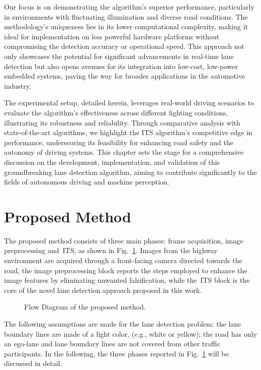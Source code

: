 Our focus is on demonstrating the algorithm's superior performance, particularly in environments with fluctuating illumination and diverse road conditions. The methodology's uniqueness lies in its lower computational complexity, making it ideal for implementation on less powerful hardware platforms without compromising the detection accuracy or operational speed. This approach not only showcases the potential for significant advancements in real-time lane detection but also opens avenues for its integration into low-cost, low-power embedded systems, paving the way for broader applications in the automotive industry.

The experimental setup, detailed herein, leverages real-world driving scenarios to evaluate the algorithm's effectiveness across different lighting conditions, illustrating its robustness and reliability. Through comparative analysis with state-of-the-art algorithms, we highlight the ITS algorithm's competitive edge in performance, underscoring its feasibility for enhancing road safety and the autonomy of driving systems. This chapter sets the stage for a comprehensive discussion on the development, implementation, and validation of this groundbreaking lane detection algorithm, aiming to contribute significantly to the fields of autonomous driving and machine perception.

\newpage

\section{Proposed Method}
\label{sec:proposed_algorithm}
The proposed method consists of three main phases: frame acquisition, image preprocessing and~\gls{ITS}, as shown in Fig.~\ref{fig:Scheme}.
\noindent Images from the highway environment are acquired through a front-facing camera directed towards the road, the image preprocessing block reports the steps employed to enhance the image features by eliminating unwanted falsification, while the~\gls{ITS} block is the core of the novel lane detection approach proposed in this work.

\begin{figure}[ht]
	\centering
	
	\caption{Flow Diagram of the proposed method.}
	\label{fig:Scheme}
\end{figure}


The following assumptions are made for the lane detection problem: the lane boundary lines are made of a light color, (e.g., white or yellow); the road has only an ego-lane and lane boundary lines are not covered from other traffic participants. In the following, the three phases reported in Fig.~\ref{fig:Scheme} will be discussed in detail.




